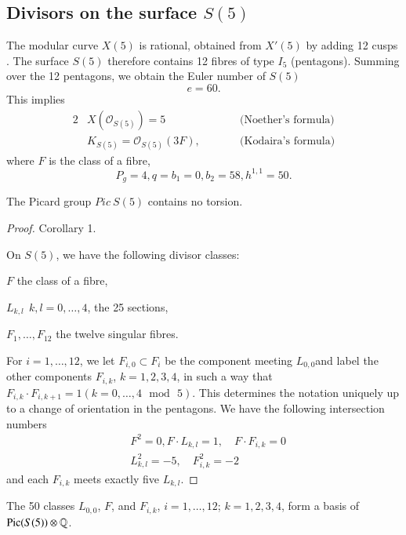 \subsection{Divisors on the surface \texorpdfstring{$S(5)$}{S5}}\label{chap2-sec4.3}

The modular curve $X(5)$ is rational, obtained from $X'(5)$ by adding
12 cusps \cite[p.23]{chap2-key10}. The surface $S(5)$ therefore
contains 12 fibres of type $I_{5}$ (pentagons). Summing over the 12
pentagons, we obtain the Euler number of $S(5)$
$$
e=60.
$$
This implies
\begin{alignat*}{2}
& X(\mathscr{O}_{S(5)})=5 &\qquad& \text{(Noether's formula)}\\
& K_{S(5)}=\mathscr{O}_{S(5)}(3F), &\qquad& \text{(Kodaira's formula)}
\end{alignat*}
where $F$ is the class of a fibre,
$$
P_{g}=4, q=b_{1}=0, b_{2}=58, h^{1,1}=50.
$$

\begin{lemma}\label{chap2-lem7}
The Picard group $Pic\ S(5)$ contains no torsion.
\end{lemma}

\begin{proof}
\cite{chap2-key13} Corollary 1.

On $S(5)$, we have the following divisor classes:

$F$ the class of a fibre,

$L_{k,l}~~k,l=0,\ldots,4$, the 25 sections,

$F_{1},\ldots,F_{12}$ the twelve singular fibres.

For $i=1,\ldots,12$, we let $F_{i,0}\subset F_{i}$ be the component
meeting $L_{0,0}$\pageoriginale and label the other components
$F_{i,k}$, $k=1,2,3,4$, in such a way that $F_{i,k}\cdot
F_{i,k+1}=1(k=0,\ldots,4\text{~ mod~ }5)$. This determines the
notation uniquely up to a change of orientation in the pentagons. We
have the following intersection numbers
\begin{align*}
& F^{2}=0, F\cdot L_{k,l}=1,\quad F\cdot F_{i,k}=0\\
& L^{2}_{k,l}=-5,\quad F^{2}_{i,k}=-2
\end{align*}
and each $F_{i,k}$ meets exactly five $L_{k,l}$.
\end{proof}

\begin{lemma}\label{chap2-lem8}
The 50 classes $L_{0,0}$, $F$, and $F_{i,k}$, $i=1,\ldots,12$;
$k=1,2,3,4$, form a basis of $\operatorname{Pic} (S(5))\otimes \mathbb{Q}$.
\end{lemma}

